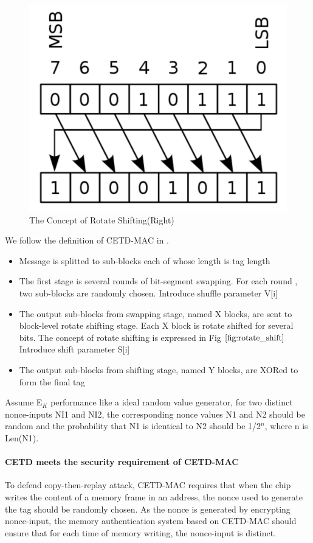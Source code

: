 \begin{figure}[htbp]
 \centering
 \includegraphics[scale=0.4]{./diagrams/rotate_right.pdf}
 \caption{The Concept of Rotate Shifting(Right)}
 \label{fig:rotate_shift}
\end{figure}
We follow the definition of CETD-MAC in \cite{keylist}. 
\begin{itemize}
	\item Message is splitted to sub-blocks each of whose length is tag length
	\item The first stage is several rounds of bit-segment swapping. For each round , two sub-blocks are randomly chosen. Introduce shuffle parameter V[i]
	\item The output sub-blocks from swapping stage, named X blocks, are sent to block-level rotate shifting stage. Each X block is rotate shifted for several bits. The concept of rotate shifting is expressed in Fig $\ref{fig:rotate_shift}$ Introduce shift parameter S[i]
	\item The output sub-blocks from shifting stage, named Y blocks, are XORed to form the final tag
\end{itemize}
Assume E$_K$ performance like a ideal random value generator, for two distinct nonce-inputs NI1 and NI2, the corresponding nonce values N1 and N2 should be random and the probability that N1 is identical to N2 should be 1/2$^n$, where n is Len(N1). 

\paragraph{CETD meets the security requirement of CETD-MAC}
To defend copy-then-replay attack, CETD-MAC requires that when the chip writes
the content of a memory frame in an address, the nonce used to generate the tag
should be randomly chosen. As the nonce is generated by encrypting nonce-input,
the memory authentication system based on CETD-MAC should ensure that for each
time of memory writing, the nonce-input is distinct.

